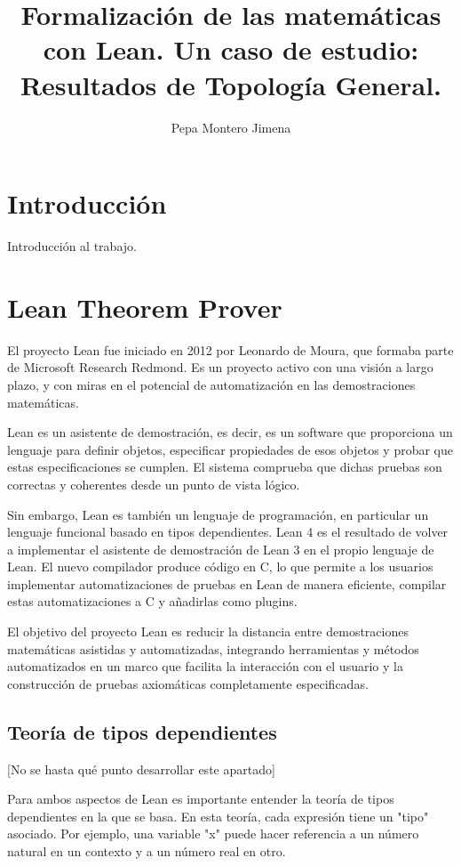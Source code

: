 \documentclass{article}
\title{Formalización de las matemáticas con Lean. Un caso de estudio: Resultados de Topología General.}
\author{Pepa Montero Jimena}
\date{}
\begin{document}
\maketitle

\section{Introducción}

Introducción al trabajo.

\section{Lean Theorem Prover}

El proyecto Lean fue iniciado en 2012 por Leonardo de Moura, que formaba parte de Microsoft Research Redmond. Es un proyecto activo con una visión a largo plazo, y con miras en el potencial de automatización en las demostraciones matemáticas.\cite{avigad2015theorem}

Lean es un asistente de demostración, es decir, es un software que proporciona un lenguaje para definir objetos, especificar propiedades de esos objetos y probar que estas especificaciones se cumplen. El sistema comprueba que dichas pruebas son correctas y coherentes desde un punto de vista lógico. \cite{leanprover2024} 

Sin embargo, Lean es también un lenguaje de programación, en particular un lenguaje funcional basado en tipos dependientes. Lean 4 es el resultado de volver a implementar el asistente de demostración de Lean 3 en el propio lenguaje de Lean. El nuevo compilador produce código en C, lo que permite a los usuarios implementar automatizaciones de pruebas en Lean de manera eficiente, compilar estas automatizaciones a C y añadirlas como plugins\cite{moura2021lean}.

El objetivo del proyecto Lean es reducir la distancia entre demostraciones matemáticas asistidas y automatizadas, integrando herramientas y métodos automatizados en un marco que facilita la interacción con el usuario y la construcción de pruebas axiomáticas completamente especificadas\cite{avigad2015theorem}.

\subsection{Teoría de tipos dependientes}

[No se hasta qué punto desarrollar este apartado]

Para ambos aspectos de Lean es importante entender la teoría de tipos dependientes en la que se basa. En esta teoría, cada expresión tiene un "tipo" asociado. Por ejemplo, una variable "x" puede hacer referencia a un número natural en un contexto y a un número real en otro.
\end{document}
